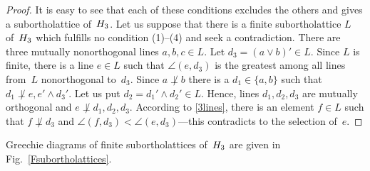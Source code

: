\begin {proof}
It is easy to see that each of these conditions excludes the others and
gives a subortholattice of~$H_3$. Let us suppose that there is a finite
subortholattice $L$ of~$H_3$ which fulfills no condition (1)--(4) and
seek a contradiction. There are three mutually nonorthogonal lines $a,b,c
\in L$. Let $d_3 = (a \lor b)' \in L$. Since $L$ is finite, there is a line
$e \in L$ such that $\angle (e,d_3)$ is the greatest among all lines
from~$L$ nonorthogonal to~$d_3$. Since $a \not\perp b$ there is a $d_1 \in
\{a,b\}$ such that $d_1 \not\perp e, e' \land d_3'$. Let us put $d_2 = d_1'
\land d_2' \in L$. Hence, lines $d_1,d_2,d_3$ are mutually orthogonal and $e
\not\perp d_1,d_2,d_3$. According to \ref{3lines}, there is an element $f
\in L$ such that $f \not\perp d_3$ and $\angle (f,d_3) < \angle
(e,d_3)$---this contradicts to the selection of~$e$.
\end {proof}


Greechie diagrams of finite subortholattices of~$H_3$ are given in
Fig.~\ref{Fsubortholattices}.


